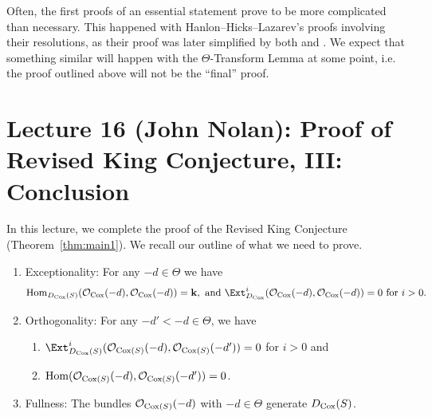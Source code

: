 \documentclass{amsart}
\begin{document}
\begin{remark}
    Often, the first proofs of an essential statement prove to be more complicated than necessary.  This happened with Hanlon--Hicks--Lazarev's proofs involving their resolutions, as their proof was later simplified by both \cite{BCHS+25} and \cite{BH25}.  We expect that something similar will happen with the $\Theta$-Transform Lemma at some point, i.e. the proof outlined above will not be the ``final'' proof.
\end{remark}


\section{Lecture 16 (John Nolan): Proof of Revised King Conjecture, III: Conclusion}

In this lecture, we complete the proof of the Revised King Conjecture (Theorem~\ref{thm:main1}).  We recall our outline of what we need to prove.
\begin{enumerate}
    \item Exceptionality:  For any $-d\in \Theta$ we have
    \[
    \Hom_{D_{\Cox}(S)}(\cO_{\Cox}(-d), \cO_{\Cox}(-d)) = \k, \text{ and }
    \Ext^i_{D_{\Cox}}(\cO_{\Cox}(-d), \cO_{\Cox}(-d)) = 0 \text { for $i>0$.}
    \]
    \item Orthogonality: For any $-d'<-d\in \Theta$, we have
        \begin{enumerate}
            \item
            $\Ext^i_{D_{\Cox}(S)}(\cO_{\Cox(S)}(-d), \cO_{\Cox(S)}(-d')) = 0$ for $i>0$ and
            \item  $\operatorname{Hom}({\mathcal O}_{\operatorname{Cox}(S)}(-d), {\mathcal O}_{\operatorname{Cox}(S)}(-d'))=0$.
        \end{enumerate}
    \item Fullness:  The bundles ${\mathcal O}_{\operatorname{Cox}(S)}(-d)$ with $-d\in \Theta$ generate $D_{\operatorname{Cox}}(S)$.
\end{enumerate}
\end{document}
